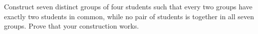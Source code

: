 Construct seven distinct groups of four students such that every two groups have exactly two students in common, while no pair of students is together in all seven groups. Prove that your construction works.
